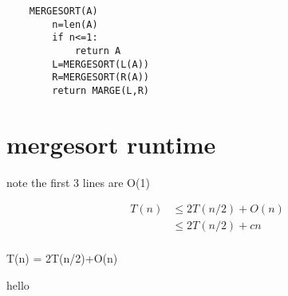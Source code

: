 \documentclass{article}
\begin{document}
\begin{verbatim}
    MERGESORT(A)
        n=len(A)
        if n<=1:
            return A
        L=MERGESORT(L(A))
        R=MERGESORT(R(A))
        return MARGE(L,R)
\end{verbatim}

\section{mergesort runtime}
note the first 3 lines are O(1)

\begin{equation}
    \begin{split}
        T(n) &\leq 2T(n/2)+O(n)\\
        &\leq 2T(n/2)+cn\\
    \end{split}
\end{equation}


T(n) = 2T(n/2)+O(n)

hello
\end{document}

